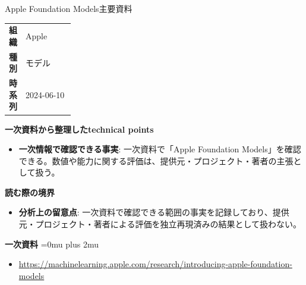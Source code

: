 \begin{technicalnote}{Apple Foundation Models}{主要資料}
\begingroup
\begin{tabularx}{\linewidth}{@{}>{\bfseries}p{0.22\linewidth}X@{}}
組織 & Apple \\
種別 & モデル \\
時系列 & 2024-06-10 \\
\end{tabularx}
\smallskip
{\bfseries 一次資料から整理したtechnical points}
\begin{itemize}[leftmargin=1.5em,itemsep=0.35em]
\item \textbf{一次情報で確認できる事実}: 一次資料で「Apple Foundation Models」を確認できる。数値や能力に関する評価は、提供元・プロジェクト・著者の主張として扱う。
\end{itemize}
\begin{minipage}{\linewidth}
{\bfseries 読む際の境界}
\begin{itemize}[leftmargin=1.5em,itemsep=0.35em]
\item \textbf{分析上の留意点}: 一次資料で確認できる範囲の事実を記録しており、提供元・プロジェクト・著者による評価を独立再現済みの結果として扱わない。
\end{itemize}
\begin{samepage}
{\bfseries 一次資料}
\begingroup\sloppy
\Urlmuskip=0mu plus 2mu\relax
\begin{itemize}[leftmargin=1.5em,itemsep=0.25em]
\item {\scriptsize\url{https://machinelearning.apple.com/research/introducing-apple-foundation-models}}
\end{itemize}
\endgroup
\end{samepage}
\end{minipage}
\endgroup
\end{technicalnote}
\medskip

